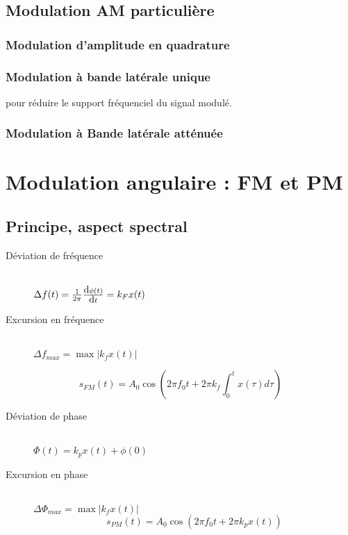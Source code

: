 \documentclass[main.tex]{subfiles}
\begin{document}
\subsection{Modulation AM particulière}
\subsubsection{Modulation d'amplitude en quadrature}
\subsubsection{Modulation à bande latérale unique}
pour réduire le support fréquenciel du signal modulé.
\subsubsection{Modulation à Bande latérale atténuée}

\section{Modulation angulaire : FM et PM}
\subsection{Principe, aspect spectral}

\begin{defin}
   \begin{description}
    \item[Déviation de fréquence]~\\
      $\Delta f(t) = \frac{1}{2\pi}\deriv[\phi(t)]{t}=k_Fx(t)$
    \item[Excursion en fréquence]~\\
      $\Delta f_{max}=\max |k_f x(t)|$
    \end{description}%
      \[
        s_{FM}(t)= A_0 \cos(2\pi f_0t +2\pi k_f \int_0^tx(\tau)d\tau)
      \]
  \end{defin}
\begin{defin}
\begin{description}
    \item[Déviation de phase]~\\
      $\Phi(t) = k_p x(t)+\phi(0)$
    \item[Excursion en phase]~\\
      $\Delta \Phi_{max}=\max |k_f x(t)|$
      \[
        s_{PM}(t)= A_0 \cos(2\pi f_0t +2\pi k_p x(t))
      \]
    \end{description}
\end{defin}
\end{document}

